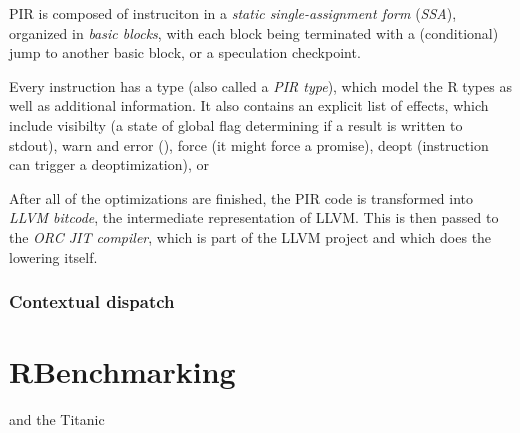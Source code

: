 PIR is composed of instruciton in a \textit{static single-assignment form} (\textit{SSA}), organized in \textit{basic blocks}, with each block being terminated with a (conditional) jump to another basic block, or a speculation checkpoint.

Every instruction has a type (also called a \textit{PIR type}), which model the R types as well as additional information. It also contains an explicit list of effects, which include visibilty (a state of global flag determining if a result is written to stdout), warn and error (\todo{\dots}), force (it might force a promise), deopt (instruction can trigger a deoptimization), or


After all of the optimizations are finished, the PIR code is transformed into \textit{LLVM bitcode}, the intermediate representation of LLVM. This is then passed to the \textit{ORC JIT compiler}, which is part of the LLVM project and which does the lowering itself.

\subsubsection*{Contextual dispatch}

\section{RBenchmarking}
and the Titanic
